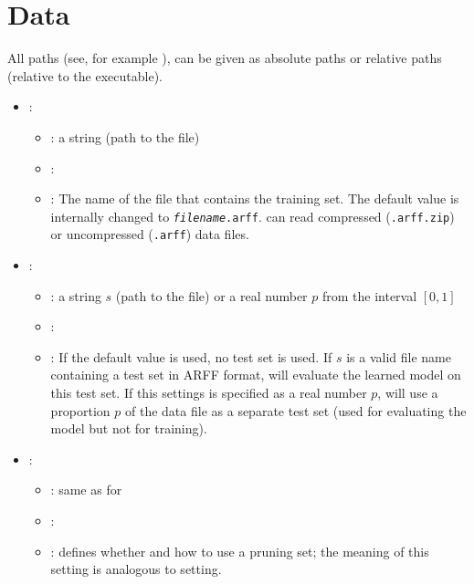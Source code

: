 \section{Data}
All paths (see, for example ), can be given as absolute paths or relative paths (relative to the \clus{} executable).

\begin{itemize}
    \item {}:
           \begin{itemize}
                \item \optionPossibleValues{}: a string (path to the file)
                \item \optionDefaultValue{}: 
                \item \optionDescrption{}: The name of the file that contains the training set. The default value is
                internally changed to {\tt {\em filename}.arff}.  \clus{} can read compressed ({\tt .arff.zip}) or uncompressed ({\tt .arff}) data files.%
           \end{itemize}
    \item {}:
           \begin{itemize}
                \item \optionPossibleValues{}: a string $s$ (path to the file) or a real number $p$ from the interval $[0, 1]$
                \item \optionDefaultValue{}: 
                \item \optionDescrption{}: If the default value  is used, no test set is used.
                 If $s$ is a valid file name containing a test set in ARFF format, \clus{} will evaluate the learned model on this test set.
                 If this settings is specified as a real number $p$, \clus{} will use a proportion $p$ of the data file as a separate test set (used for evaluating the model but not for training).
           \end{itemize}
    \item {}:
           \begin{itemize}
                \item \optionPossibleValues{}: same as for 
                \item \optionDefaultValue{}: 
                \item \optionDescrption{}: defines whether and how to use a pruning set; the meaning of this setting is analogous to  setting.

\end{itemize}
\end{itemize}
